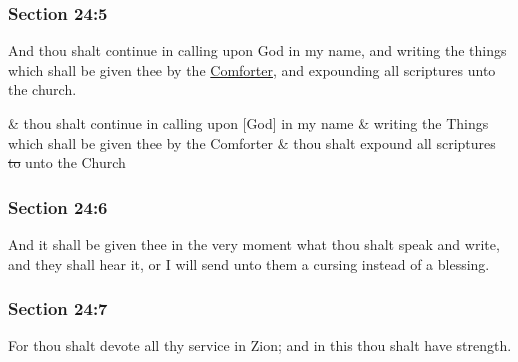 	\subsubsection{Section 24:5} %
		\label{DC24-5}

		And thou shalt continue in calling upon God in my name, and writing the things which shall be given thee by the \hyperref[COMFORTER]{Comforter}, and expounding all scriptures unto the church.

		\begin{framed}
		\scriptsize
			\begin{compactdesc}
				\item[JSP] \& thou shalt continue in calling upon [God] in my name \& writing the Things which shall be given thee by the Comforter \& thou shalt expound all scriptures \sout{to} unto the Church
			\end{compactdesc}
		\end{framed}

	\subsubsection{Section 24:6} %
		\label{DC24-6}

		And it shall be given thee in the very moment what thou shalt speak and write, and they shall hear it, or I will send unto them a cursing instead of a blessing.


	\subsubsection{Section 24:7} %
		\label{DC24-7}

		For thou shalt devote all thy service in Zion; and in this thou shalt have strength.


